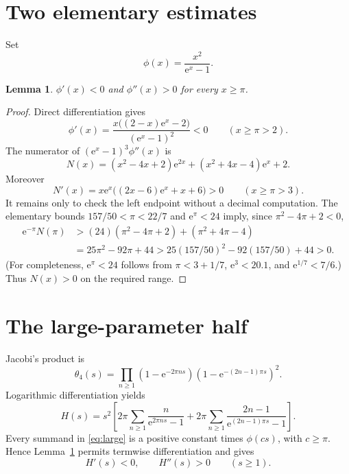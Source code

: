 \documentclass[11pt,a4paper]{article}
\newtheorem{lemma}{Lemma}
\newcommand{\e}{\mathrm e}
\newcommand{\thfour}{\theta_4}
\begin{document}
\section*{Two elementary estimates}
Set
\[
 \phi(x)=\frac{x^2}{\e^x-1}.
\]

\begin{lemma}\label{lem:phi}
$\phi'(x)<0$ and $\phi''(x)>0$ for every $x\geq\pi$.
\end{lemma}

\begin{proof}
Direct differentiation gives
\[
 \phi'(x)=\frac{x\bigl((2-x)\e^x-2\bigr)}{(\e^x-1)^2}<0
 \qquad(x\geq\pi>2).
\]
The numerator of $(\e^x-1)^3\phi''(x)$ is
\[
 N(x)=(x^2-4x+2)\e^{2x}+(x^2+4x-4)\e^x+2.
\]
Moreover
\[
 N'(x)=x\e^x\bigl((2x-6)\e^x+x+6\bigr)>0\qquad(x\geq\pi>3).
\]
It remains only to check the left endpoint without a decimal computation.
The elementary bounds $157/50<\pi<22/7$ and $\e^\pi<24$ imply, since
$\pi^2-4\pi+2<0$,
\begin{align*}
 \e^{-\pi}N(\pi)
 &>(24)(\pi^2-4\pi+2)+(\pi^2+4\pi-4)\\
 &=25\pi^2-92\pi+44
  >25(157/50)^2-92(157/50)+44>0.
\end{align*}
(For completeness, $\e^\pi<24$ follows from $\pi<3+1/7$,
$\e^3<20.1$, and $\e^{1/7}<7/6$.)  Thus $N(x)>0$ on the required range.
\end{proof}

\section*{The large-parameter half}
Jacobi's product is
\[
 \thfour(s)=\prod_{n\geq1}(1-\e^{-2\pi ns})
              (1-\e^{-(2n-1)\pi s})^2.
\]
Logarithmic differentiation yields
\begin{equation}\label{eq:large}
 H(s)=s^2\left[
 2\pi\sum_{n\geq1}\frac{n}{\e^{2\pi ns}-1}
 +2\pi\sum_{n\geq1}\frac{2n-1}{\e^{(2n-1)\pi s}-1}
 \right].
\end{equation}
Every summand in \eqref{eq:large} is a positive constant times
$\phi(c s)$, with $c\geq\pi$.  Hence Lemma~\ref{lem:phi} permits termwise
differentiation and gives
\begin{equation}\label{eq:large-signs}
 H'(s)<0,\qquad H''(s)>0\qquad(s\geq1).
\end{equation}
\end{document}
